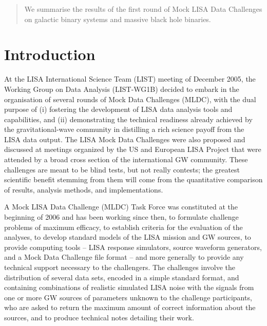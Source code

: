 \documentclass[11pt]{article}
\begin{document}

\maketitle

\begin{abstract}

We summarise the results of the first round of Mock LISA Data Challenges on galactic binary systems and massive black hole binaries.

\end{abstract}


\section{Introduction}

At the LISA International Science Team (LIST) meeting of December 2005, the Working Group on Data Analysis (LIST-WG1B) decided to embark in the organisation of several rounds of Mock Data Challenges (MLDC), with the dual purpose of (i)  fostering the development of LISA data analysis tools and capabilities, and (ii) demonstrating the technical readiness already achieved by the gravitational-wave community in distilling a rich science payoff from the LISA data output. The LISA Mock Data Challenges were also proposed and discussed at meetings organized by the US and European LISA Project that were attended by a broad cross section of the international GW community. These challenges are meant to be blind tests, but not really contests; the greatest scientific benefit stemming from them will come from the quantitative comparison of results, analysis methods, and implementations.

A Mock LISA Data Challenge (MLDC) Task Force was constituted at the beginning of 2006 and has been working since then, to formulate challenge problems of maximum efficacy, to establish criteria for the evaluation of the analyses, to develop standard models of the LISA mission and GW sources, to provide computing tools -- LISA response simulators, source waveform generators, and a Mock Data Challenge file format -- and more generally to provide any technical support necessary to the challengers. The challenges involve the distribution of several data sets, encoded in a simple standard format, and containing combinations of realistic simulated LISA noise with the signals from one or more GW sources of parameters unknown to the challenge participants, who are asked to return the maximum amount of correct information about the sources, and to produce technical notes detailing their work. 
\end{document}
